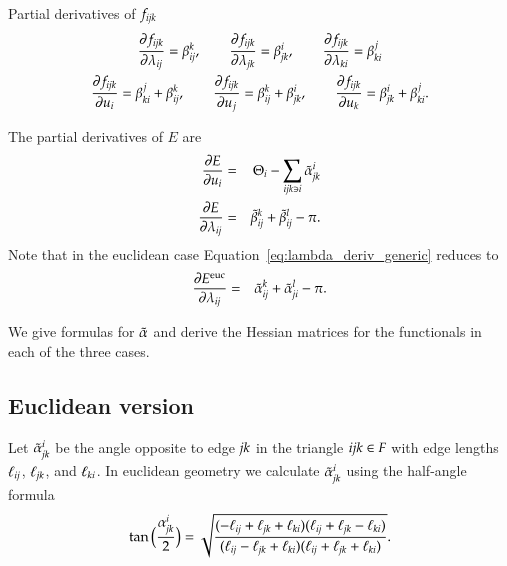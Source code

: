 \documentclass[Thesis]{subfiles}
\begin{document}
\begin{proposition}{Partial derivatives of $f_{\it ijk}$}
\begin{gather}
\frac{\partial f_{\it ijk}}{\partial \lambda_{\it ij}}=\beta^k_{\it ij},\quad\quad
\frac{\partial f_{\it ijk}}{\partial \lambda_{\it jk}}=\beta^i_{\it jk},\quad\quad
\frac{\partial f_{\it ijk}}{\partial \lambda_{\it ki}}=\beta^j_{\it ki}\\
\frac{\partial f_{\it ijk}}{\partial u_i}=\beta^j_{\it ki}+\beta^k_{\it ij},\quad\quad
\frac{\partial f_{\it ijk}}{\partial u_j}=\beta^k_{\it ij}+\beta^i_{\it jk},\quad\quad
\frac{\partial f_{\it ijk}}{\partial u_k}=\beta^i_{\it jk}+\beta^j_{\it ki}.
\end{gather}
\end{proposition}

The partial derivatives of $E$ are
\begin{eqnarray}
	\frac{\partial E}{\partial u_i} &=& \Theta_i - \sum_{\it ijk\ni i}\tilde{\alpha}_{\it jk}^i \\
	\frac{\partial E}{\partial \lambda_{\it ij}} &=& \tilde{\beta}_{\it ij}^k + \tilde{\beta}_{\it ij}^l -\pi.\label{eq:lambda_deriv_generic}
\end{eqnarray}
Note that in the euclidean case Equation~\ref{eq:lambda_deriv_generic} reduces to
\begin{eqnarray}
	\frac{\partial E^{\rm euc}}{\partial \lambda_{\it ij}} &=& \tilde{\alpha}_{\it ij}^k + \tilde{\alpha}_{\it ji}^l - \pi.\label{eq:lambda_deriv_euc}
\end{eqnarray}

We give formulas for $\tilde{\alpha}$ and derive the Hessian matrices for the functionals in each of the three cases.

\subsection{Euclidean version}
\label{sec:euclidean_fuctional}

Let $\tilde{\alpha}^i_{\it jk}$ be the angle opposite to edge $\it jk$ in the triangle $\it ijk\in F$ with edge lengths $\ell_{\it ij}$, $\ell_{\it jk}$, and $\ell_{\it ki}$. In euclidean geometry we calculate $\tilde{\alpha}^i_{\it jk}$ using the half-angle formula
\[\tan\Big(\frac{ \alpha_{\it jk}^i}{2}\Big) = \sqrt{\frac
{(-\ell_{\it ij} +\ell_{\it jk} +\ell_{\it ki})(\ell_{\it ij} +\ell_{\it jk} -\ell_{\it ki})}
{(\ell_{\it ij} -\ell_{\it jk} +\ell_{\it ki})(\ell_{\it ij} + \ell_{\it jk} +\ell_{\it ki})}}.\]
\end{document}
